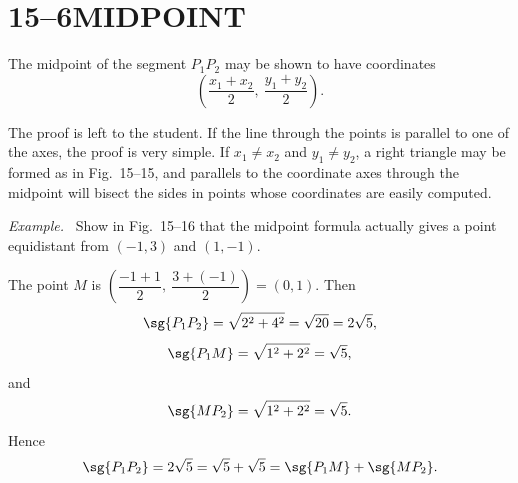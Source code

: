 \documentclass[11pt]{book}
\theoremstyle{bkplain}
\theoremstyle{XIplainnote}
\theoremstyle{bkplain}
\theoremstyle{bkplain}
\newenvironment{XVexample}[1][]{\par\medskip\noindent\emph{Example#1.}\ }{\par\medskip}
\begin{document}
\section*{15--6\quad MIDPOINT}

The midpoint of the segment $P_1P_2$ may be shown to have coordinates
\[
\left(\frac{x_1+x_2}{2},\ \frac{y_1+y_2}{2}\right).
\]

The proof is left to the student. If the line through the points is parallel
to one of the axes, the proof is very simple. If $x_1 \neq x_2$ and
$y_1 \neq y_2$, a right triangle may be formed as in Fig.~15--15, and
parallels to the coordinate axes through the midpoint will bisect the sides in
points whose coordinates are easily computed.

\begin{XVexample}
Show in Fig.~15--16 that the midpoint formula actually gives a point
equidistant from $(-1, 3)$ and $(1, -1)$.
\end{XVexample}

\FIGXVFIFTEENSIXTEEN

The point $M$ is
$\left(\dfrac{-1+1}{2},\ \dfrac{3+(-1)}{2}\right) = (0, 1)$. Then
\[
\sg{P_1P_2} = \sqrt{2^2 + 4^2} = \sqrt{20} = 2\sqrt{5},
\]
\[
\sg{P_1M} = \sqrt{1^2 + 2^2} = \sqrt{5},
\]
and
\[
\sg{MP_2} = \sqrt{1^2 + 2^2} = \sqrt{5}.
\]
Hence
\[
\sg{P_1P_2} = 2\sqrt{5} = \sqrt{5} + \sqrt{5} = \sg{P_1M} + \sg{MP_2}.
\]
\end{document}
